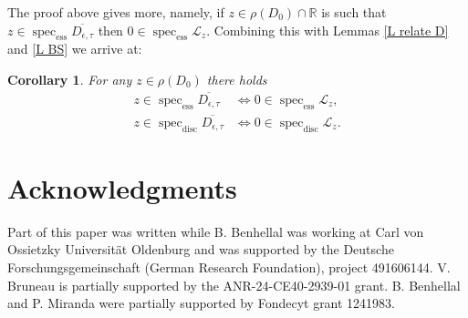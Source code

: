 \documentclass[11pt,a4paper,reqno,oneside]{amsproc}
\DeclareMathOperator{\spec}{spec}
\newcommand{\specd}{\spec_\mathrm{disc}}
\newcommand{\spece}{\spec_\mathrm{ess}}
\def \rr {{\mathbb R}}
\numberwithin{equation}{section}
\newtheorem{corollary}[definition]{Corollary}
\begin{document}
The proof above gives more, namely, if $z\in \rho(D_0)\cap\rr$ is such that $z\in\spece  \overline{D_{\epsilon,\tau}}$ then $0\in\spece \mathcal L_z$. Combining this with Lemmas \ref{L relate D} and \ref{L BS}  we arrive at:
\begin{corollary} For any $z\in\rho(D_0)$ there holds
\begin{align*}
z\in \spece  \overline{D_{\epsilon,\tau}}  &\Leftrightarrow0\in \spece \mathcal L_z ,\\
z\in \specd  \overline{D_{\epsilon,\tau}}  &\Leftrightarrow0\in \specd \mathcal L_z.
\end{align*}
\end{corollary}
	

	\section*{Acknowledgments} 
	Part of this paper was written while B. Benhellal was working at Carl von Ossietzky Universit\"at Oldenburg and was supported by the Deutsche Forschungsgemeinschaft (German Research Foundation), project 491606144. V. Bruneau is partially supported by the ANR-24-CE40-2939-01 grant. B. Benhellal and  P. Miranda were partially supported by Fondecyt grant 1241983.
\end{document}
